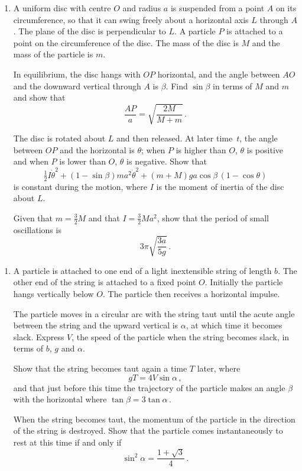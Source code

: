 \documentclass[a4, 11pt]{report}
\newlength{\qspace}
\newcounter{qnumber}
\newenvironment{question}%
 {\vspace{\qspace}
  \begin{enumerate}[\bfseries 1\quad][10]%
    \setcounter{enumi}{\value{qnumber}}%
    \item%
 }
{
  \end{enumerate}
  \filbreak
  \stepcounter{qnumber}
 }
\begin{document}
\begin{question}
A uniform
disc  with centre $O$ and radius $a$
is suspended from a  point $A$ on 
its circumference, so that it can swing freely about a horizontal 
axis $L$ through $A$. The plane of the disc is perpendicular to $L$.
A particle $P$ is attached to a point on the circumference of the 
disc. The mass of the disc is $M$ 
and the mass of the particle is $m$.

In equilibrium, the disc hangs with $OP$ horizontal, and  the angle
between $AO$ and the downward vertical through $A$ is $\beta$.
Find $\sin\beta$ in terms of $M$ and $m$ 
and show that
\[
\frac{AP}{a}  = \sqrt{\frac{2M}{M+m}} 
\,.
\]

The disc is rotated about $L$  and then released. 
 At later time~$t$, the angle between $OP$ and the 
horizontal is $\theta$; when $P$ is higher than $O$, $\theta$ is positive
and when $P$ is lower than $O$, $\theta$ is negative. Show that 
\[
\tfrac12 I \dot\theta^2 + (1-\sin\beta)ma^2 \dot \theta^2
+ (m+M)g a\cos\beta \, (1- \cos\theta)  
\] 
is constant during the motion, where $I$ is the moment of inertia
of the disc about $L$.

Given that $m= \frac 32 M$ and that $I= \frac32Ma^2$, 
show  that the period  of 
small oscillations  is 
\[
3\pi \sqrt{\frac {3a}{5g}}
\,.
\]

\end{question}


\begin{question}
A particle  
is attached to one end of a light inextensible string of length $ b$. 
The other end of the string is attached to a 
fixed point $O$.
Initially the particle hangs vertically below $O$.
The particle then receives a horizontal impulse.

The particle moves  in a circular arc with the string taut
until the acute angle between the string and the upward
vertical is $\alpha   $, at which time it becomes slack.
Express $V$, the speed of the particle when the string
becomes slack, in terms of $ b$, $g$ and $\alpha   $.
  
Show that 
the string becomes taut again a time
$T$ later, where
\[
gT = 4V \sin\alpha     
\,,\]
and that just before this time the trajectory of the  
particle makes an angle $\beta $ with 
the horizontal where $\tan\beta = 3\tan \alpha \,$.

When the string becomes taut, the momentum of the 
particle  in the direction of the string is destroyed.
Show that the particle comes instantaneously to rest 
at this time if and only if 
\[
\sin^2\alpha = \dfrac {1+\sqrt3}4 \,.
\]


\end{question}
\end{document}
